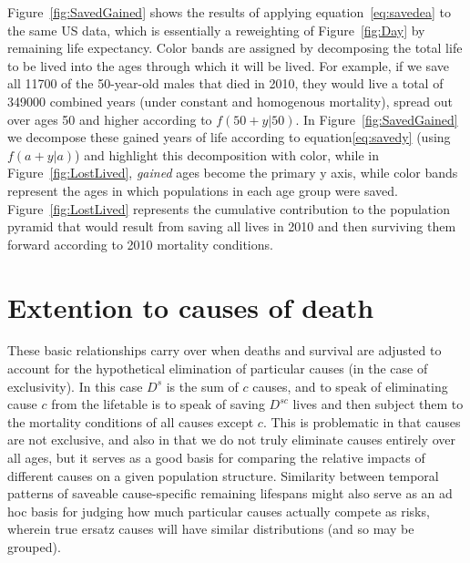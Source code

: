 \documentclass{article}
\begin{document}
Figure~\ref{fig:SavedGained} shows the results of applying
equation~\eqref{eq:savedea} to the same US data, which is essentially a
reweighting of Figure~\ref{fig:Day} by remaining life expectancy. Color bands
are assigned by decomposing the total life to be lived into the ages through
which it will be lived. For example, if we save all 11700 of the 50-year-old
males that died in 2010, they would live a total of 349000 combined years (under
constant and homogenous mortality), spread out over ages 50 and higher according
to $f(50+y|50)$. In Figure~\ref{fig:SavedGained} we decompose these gained
years of life according to equation\eqref{eq:savedy} (using $f(a+y|a)$) and
highlight this decomposition with color, while in Figure~\ref{fig:LostLived}, \textit{gained} ages become the primary y axis,
while color bands represent the ages in which populations in each age group were
saved. Figure~\ref{fig:LostLived} represents the cumulative contribution to the
population pyramid that would result from saving all lives in 2010 and then
surviving them forward according to 2010 mortality conditions.

\section{Extention to causes of death}

These basic relationships carry over when deaths and survival are adjusted to
account for the hypothetical elimination of particular causes (in the case of
exclusivity). In this case $D^s$ is the sum of $c$ causes, and to speak of
eliminating cause $c$ from the lifetable is to speak of saving $D^{sc}$ lives and then
subject them to the mortality conditions of all causes except $c$.
This is problematic in that causes are not exclusive, and also in that we do not
truly eliminate causes entirely over all ages, but it serves as a good basis for comparing the relative
impacts of different causes on a given population structure. Similarity between
temporal patterns of saveable cause-specific remaining lifespans might also
serve as an ad hoc basis for judging how much particular causes actually compete
as risks, wherein true ersatz causes will have similar distributions (and so may
be grouped).
\end{document}
